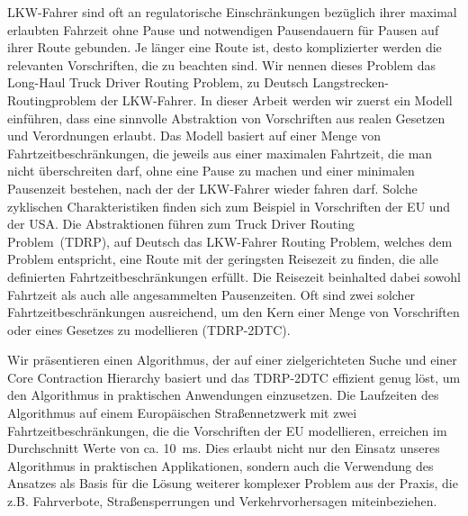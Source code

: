 \documentclass{thesisclass}
\begin{document}
\begin{addmargin}{0.5cm}
	LKW-Fahrer sind oft an regulatorische Einschränkungen bezüglich ihrer maximal erlaubten Fahrzeit ohne Pause und notwendigen Pausendauern für Pausen auf ihrer Route gebunden. Je länger eine Route ist, desto komplizierter werden die relevanten Vorschriften, die zu beachten sind. Wir nennen dieses Problem das \glqq Long-Haul Truck Driver Routing Problem\grqq, zu Deutsch \glqq Langstrecken-Routingproblem der LKW-Fahrer\grqq. In dieser Arbeit werden wir zuerst ein Modell einführen, dass eine sinnvolle Abstraktion von Vorschriften aus realen Gesetzen und Verordnungen erlaubt. Das Modell basiert auf einer Menge von Fahrtzeitbeschränkungen, die jeweils aus einer maximalen Fahrtzeit, die man nicht überschreiten darf, ohne eine Pause zu machen und einer minimalen Pausenzeit bestehen, nach der der LKW-Fahrer wieder fahren darf. Solche zyklischen Charakteristiken finden sich zum Beispiel in Vorschriften der EU und der USA. Die Abstraktionen führen zum \glqq Truck Driver Routing Problem\grqq\ (TDRP), auf Deutsch das \glqq LKW-Fahrer Routing Problem\grqq, welches dem Problem entspricht, eine Route mit der geringsten Reisezeit zu finden, die alle definierten Fahrtzeitbeschränkungen erfüllt. Die Reisezeit beinhalted dabei sowohl Fahrtzeit als auch alle angesammelten Pausenzeiten. Oft sind zwei solcher Fahrtzeitbeschränkungen ausreichend, um den Kern einer Menge von Vorschriften oder eines Gesetzes zu modellieren (TDRP-2DTC).

	Wir präsentieren einen Algorithmus, der auf einer zielgerichteten Suche und einer Core Contraction Hierarchy basiert und das TDRP-2DTC effizient genug löst, um den Algorithmus in praktischen Anwendungen einzusetzen. Die Laufzeiten des Algorithmus auf einem Europäischen Straßennetzwerk mit zwei Fahrtzeitbeschränkungen, die die Vorschriften der EU modellieren, erreichen im Durchschnitt Werte von ca. \SI{10}{\milli\second}. Dies erlaubt nicht nur den Einsatz unseres Algorithmus in praktischen Applikationen, sondern auch die Verwendung des Ansatzes als Basis für die Lösung weiterer komplexer Problem aus der Praxis, die z.B. Fahrverbote, Straßensperrungen und Verkehrvorhersagen miteinbeziehen.
\end{addmargin}

\blankpage


\tableofcontents
\blankpage
\listoffigures
\listoftables
\listofalgorithms
\cleardoublepage


\end{document}
